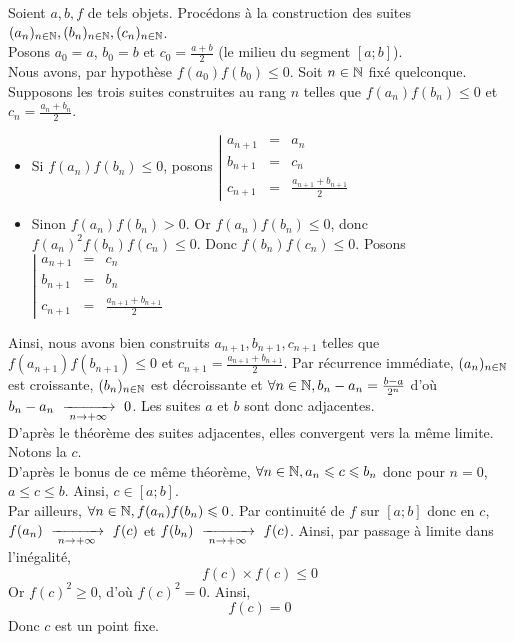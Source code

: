 \documentclass{article}
\begin{document}
\begin{question_kholle}
	\noindent Soient $a,b,f$ de tels objets. Procédons à la construction des suites $(a_n)_{n\in\mathbb N}, (b_n)_{n\in\mathbb N}, (c_n)_{n\in\mathbb N}$.\\
	Posons $a_0 = a$, $b_0 = b$ et $c_0 = \frac{a+b}{2}$ (le milieu du segment $[a;b]$).\\
	Nous avons, par hypothèse $f(a_0)f(b_0) \leqslant 0$.
	Soit $n \in \mathbb N$ fixé quelconque.\\
	Supposons les trois suites construites au rang $n$ telles que $f(a_n)f(b_n) \leqslant 0$ et $c_n = \frac{a_n+b_n}{2}$.
	\begin{itemize}
		\item Si $f(a_n)f(b_n) \leqslant 0$, posons $\left| \begin{array}{lcl}
				      a_{n+1} & = & a_n                       \\
				      b_{n+1} & = & c_n                       \\
				      c_{n+1} & = & \frac{a_{n+1}+b_{n+1}}{2}
			      \end{array} \right.$
		\item Sinon $f(a_n)f(b_n) > 0$. Or $f(a_n)f(b_n) \leqslant 0$, donc $f(a_n)^2 f(b_n) f(c_n) \leqslant 0$. Donc $f(b_n)f(c_n) \leqslant 0$. Posons $\left| \begin{array}{lcl}
				      a_{n+1} & = & c_n                       \\
				      b_{n+1} & = & b_n                       \\
				      c_{n+1} & = & \frac{a_{n+1}+b_{n+1}}{2}
			      \end{array} \right.$
	\end{itemize}
	Ainsi, nous avons bien construits $a_{n+1}, b_{n+1}, c_{n+1}$ telles que $f(a_{n+1})f(b_{n+1}) \leqslant 0$ et ${ c_{n+1} = \frac{a_{n+1}+b_{n+1}}{2} }$.
	Par récurrence immédiate, $(a_n)_{n\in\mathbb N}$ est croissante, $(b_n)_{n\in\mathbb N}$ est décroissante et ${ \forall n \in \mathbb N, b_n - a_n = \frac{b-a}{2^n} }$ d'où $b_n - a_n \ \xrightarrow[\;n \to +\infty\;]{}\  0$.
	Les suites $a$ et $b$ sont donc adjacentes.\\
	D'après le théorème des suites adjacentes, elles convergent vers la même limite. Notons la $c$.\\
	D'après le bonus de ce même théorème, $\forall n \in \mathbb N, a_n \leqslant c \leqslant b_n$ donc pour $n = 0$, $a \leqslant c \leqslant b$. Ainsi, $c \in [a;b]$.\\
	Par ailleurs, $\forall n \in \mathbb N, f(a_n)f(b_n) \leqslant 0$. Par continuité de $f$ sur $[a;b]$ donc en $c$, $f(a_n) \ \xrightarrow[\;n \to +\infty\;]{}\  f(c)$ et $f(b_n) \ \xrightarrow[\;n \to +\infty\;]{}\  f(c)$. Ainsi, par passage à limite dans l'inégalité,
	\begin{equation*}
		f(c) \times f(c) \leqslant 0
	\end{equation*}
	Or $f(c)^2 \geqslant 0$, d'où $f(c)^2 = 0$. Ainsi,
	\begin{equation*}
		f(c) = 0
	\end{equation*}
	Donc $c$ est un point fixe.

\end{question_kholle}
\end{document}
